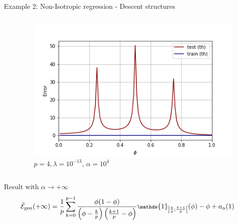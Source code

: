 \documentclass[10pt]{beamer}
\begin{document}
\begin{frame}{Example 2: Non-Isotropic regression - Descent structures}
\begin{columns}
\begin{column}{0.5\textwidth}
    \end{column}
    \begin{column}{0.5\textwidth}
      \begin{figure}
        \centering
            \includegraphics[width=\textwidth]{images/multiple-3descents.png}
        \caption{\footnotesize $p=4, \lambda=10^{-13}$, $\alpha = 10^4$
        }
      \end{figure}
    \end{column}
  \end{columns}


  \begin{block}{Result with $\alpha \to +\infty$ \cite{bodin.2212.06757}}
  \vspace*{-0.25cm}
    \begin{equation*}\footnotesize
      \bar{\mathcal E}_{\text{gen}}(+\infty) = \frac{1}{p} \sum_{k=0}^{p-1}
      \frac{\phi (1-\phi)}{
          \left( \phi - \frac{k}{p} \right) \left( \frac{k + 1}{p} - \phi \right) 
      }  \mathds{1}_{\left] \frac{k}{p}; \frac{k+1}{p} \right[}(\phi) - \phi + o_\alpha(1)
  \end{equation*}
  \vspace*{-0.25cm}
  \end{block}

\end{frame}
\end{document}
